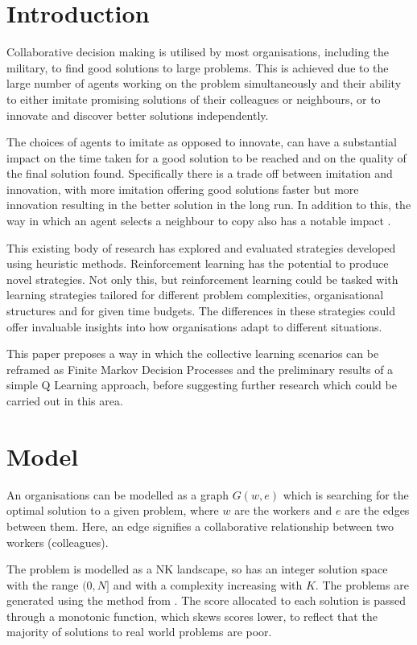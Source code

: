 \documentclass[conference]{IEEEtran}
\begin{document}
\section{Introduction}\label{intro}
Collaborative decision making is utilised by most organisations,
including the military,
to find good solutions to large problems.
This is achieved due
to the large number of agents working on the problem simultaneously
and their ability to either
imitate promising solutions of their colleagues or neighbours,
or to innovate and discover better solutions independently.

The choices of agents to imitate as opposed to innovate,
can have a substantial impact on the time taken
for a good solution to be reached
and on the quality of the final solution found.
Specifically there is a trade off between imitation and innovation,
with more imitation offering good solutions faster
but more innovation resulting in the better solution in the long run.
In addition to this,
the way in which an agent selects a neighbour to copy
also has a notable impact
\cite{monotonic, sociallearning}.

This existing body of research
has explored and evaluated strategies developed using heuristic methods.
Reinforcement learning has the potential to produce novel strategies.
Not only this, but reinforcement learning could be tasked with
learning strategies tailored for different problem complexities,
organisational structures and for given time budgets.
The differences in these strategies could offer invaluable insights
into how organisations adapt to different situations.

This paper preposes a way in which the collective learning scenarios
can be reframed as Finite Markov Decision Processes
and the preliminary results of a simple Q Learning approach,
before suggesting further research
which could be carried out in this area.


\section{Model}

An organisations can be modelled as a graph $G(w, e)$
which is searching for the optimal solution to a given problem,
where $w$ are the workers and $e$ are the edges between them.
Here, an edge signifies a collaborative relationship between two workers
(colleagues).

The problem is modelled as a NK landscape,
so has an integer solution space with the range $(0, N]$
and with a complexity increasing with $K$.
The problems are generated using the method from \cite{monotonic}.
The score allocated to each solution is passed through a monotonic function,
which skews scores lower,
to reflect that the majority of solutions
to real world problems are poor.
\end{document}
